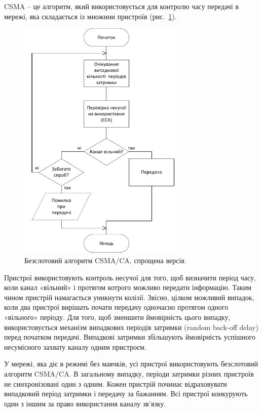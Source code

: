 \documentclass[a4paper,ukrainian,utf8,nocolumnsxix,floatsection]{eskdtext}
\newcommand{\figref}[1]{рис.~\ref{#1}}
\newcommand{\csma}[0]{CSMA/CA\xspace}
\begin{document}
CSMA – це алгоритм, який використовується для контролю часу передачі в мережі, яка складається із множини пристроїв (\figref{fig:csma-ca}).

\begin{figure}[bth]
	\centering
	\includegraphics[width=0.7\textwidth]{img/csma-ca.pdf}
	\caption{\label{fig:csma-ca}Безслотовий алгоритм \csma, спрощена версія.}
\end{figure}

Пристрої використовують контроль несучої для того, щоб визначити період часу, коли канал «вільний» і протягом котрого можливо передати інформацію. Таким чином пристрій намагається уникнути колізії. Звісно, цілком можливий випадок, коли два пристрої вирішать почати передачу  одночасно протягом одного  «вільного» періоду. Для того, щоб зменшити ймовірність цього випадку, використовується механізм випадкових періодів затримки (random back-off delay) перед початком передачі. Випадкові затримки збільшують ймовірність успішного несумісного захвату каналу одним пристроєм.

У мережі, яка діє в режимі без маячків, усі пристрої використовують безслотовий алгоритм \csma. В загальному випадку, періоди затримки різних пристроїв не синхронізовані один з одним.  Кожен пристрій починає відраховувати випадковий період затримки і передачу за бажанням. Всі пристрої конкурують один з іншим за право використання каналу зв’язку. 
\end{document}
